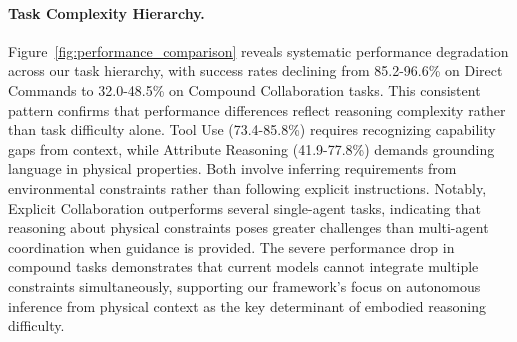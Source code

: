 \paragraph{Task Complexity Hierarchy.}
Figure~\ref{fig:performance_comparison} reveals systematic performance degradation across our task hierarchy, with success rates declining from 85.2-96.6\% on Direct Commands to 32.0-48.5\% on Compound Collaboration tasks. This consistent pattern confirms that performance differences reflect reasoning complexity rather than task difficulty alone. Tool Use (73.4-85.8\%) requires recognizing capability gaps from context, while Attribute Reasoning (41.9-77.8\%) demands grounding language in physical properties. Both involve inferring requirements from environmental constraints rather than following explicit instructions. Notably, Explicit Collaboration outperforms several single-agent tasks, indicating that reasoning about physical constraints poses greater challenges than multi-agent coordination when guidance is provided. The severe performance drop in compound tasks demonstrates that current models cannot integrate multiple constraints simultaneously, supporting our framework's focus on autonomous inference from physical context as the key determinant of embodied reasoning difficulty.


